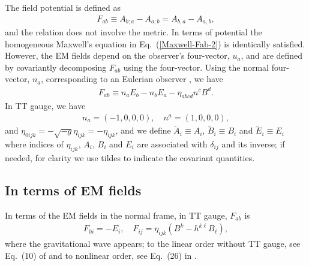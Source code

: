 \documentclass[twocolumn,amsmath,amssymb]{revtex4}
\newcommand{\bea}{\begin{eqnarray}}
\newcommand{\eea}{\end{eqnarray}}
\begin{document}
The field potential is defined as
\bea
   F_{ab} \equiv A_{b;a} - A_{a;b} = A_{b,a} - A_{a,b},
\eea
and the relation does not involve the metric. In terms of potential the homogeneous Maxwell's equation in Eq.\ (\ref{Maxwell-Fab-2}) is identically satisfied. However, the EM fields depend on the observer's four-vector, $u_a$, and are defined by covariantly decomposing $F_{ab}$ using the four-vector. Using the normal four-vector, $n_a$, corresponding to an Eulerian observer \cite{Smarr-York-1978}, we have \cite{Moller-1952, Lichnerowicz-1967, Ellis-1973}
\bea
   F_{ab} \equiv n_a E_b - n_b E_a - \eta_{abcd} n^c B^d.
\eea
In TT gauge, we have
\bea
   n_a = (-1, 0, 0, 0), \quad n^a = (1, 0, 0, 0),
\eea
and $\eta_{0ijk} = - \sqrt{-g} \eta_{ijk} = - \eta_{ijk}$, and we define $\widetilde A_i \equiv A_i$, $\widetilde B_i \equiv B_i$ and $\widetilde E_i \equiv E_i$ where indices of $\eta_{ijk}$, $A_i$, $B_i$ and $E_i$ are associated with $\delta_{ij}$ and its inverse; if needed, for clarity we use tildes to indicate the covariant quantities.


\subsection{In terms of EM fields}

In terms of the EM fields in the normal frame, in TT gauge, $F_{ab}$ is
\bea
   F_{0i} = - E_i, \quad
       F_{ij} = \eta_{ijk} ( B^k - h^{k\ell} B_\ell ),
   \label{Fab-EB-metric}
\eea
where the gravitational wave appears; to the linear order without TT gauge, see Eq.\ (10) of \cite{EM-definition} and to nonlinear order, see Eq.\ (26) in \cite{Hwang-Noh-2023-EM-NL}.
\end{document}
